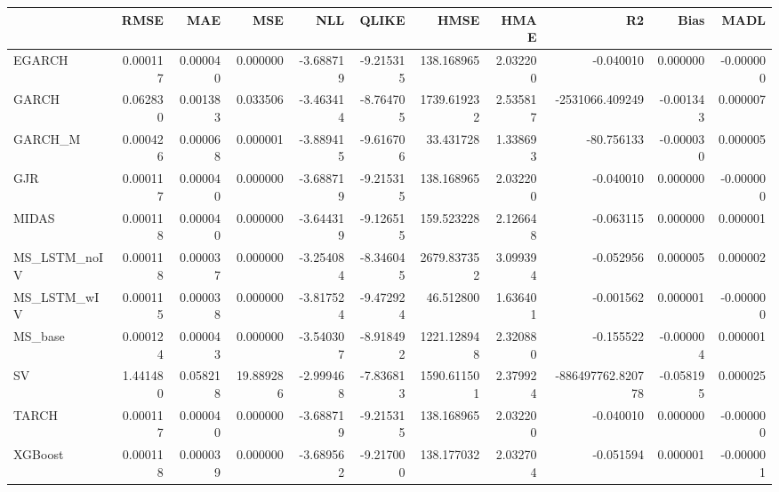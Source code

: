 \begin{tabular}{lrrrrrrrrrr}
\toprule
 & RMSE & MAE & MSE & NLL & QLIKE & HMSE & HMAE & R2 & Bias & MADL \\
\midrule
EGARCH & 0.000117 & 0.000040 & 0.000000 & -3.688719 & -9.215315 & 138.168965 & 2.032200 & -0.040010 & 0.000000 & -0.000000 \\
GARCH & 0.062830 & 0.001383 & 0.033506 & -3.463414 & -8.764705 & 1739.619232 & 2.535817 & -2531066.409249 & -0.001343 & 0.000007 \\
GARCH_M & 0.000426 & 0.000068 & 0.000001 & -3.889415 & -9.616706 & 33.431728 & 1.338693 & -80.756133 & -0.000030 & 0.000005 \\
GJR & 0.000117 & 0.000040 & 0.000000 & -3.688719 & -9.215315 & 138.168965 & 2.032200 & -0.040010 & 0.000000 & -0.000000 \\
MIDAS & 0.000118 & 0.000040 & 0.000000 & -3.644319 & -9.126515 & 159.523228 & 2.126648 & -0.063115 & 0.000000 & 0.000001 \\
MS_LSTM_noIV & 0.000118 & 0.000037 & 0.000000 & -3.254084 & -8.346045 & 2679.837352 & 3.099394 & -0.052956 & 0.000005 & 0.000002 \\
MS_LSTM_wIV & 0.000115 & 0.000038 & 0.000000 & -3.817524 & -9.472924 & 46.512800 & 1.636401 & -0.001562 & 0.000001 & -0.000000 \\
MS_base & 0.000124 & 0.000043 & 0.000000 & -3.540307 & -8.918492 & 1221.128948 & 2.320880 & -0.155522 & -0.000004 & 0.000001 \\
SV & 1.441480 & 0.058218 & 19.889286 & -2.999468 & -7.836813 & 1590.611501 & 2.379924 & -886497762.820778 & -0.058195 & 0.000025 \\
TARCH & 0.000117 & 0.000040 & 0.000000 & -3.688719 & -9.215315 & 138.168965 & 2.032200 & -0.040010 & 0.000000 & -0.000000 \\
XGBoost & 0.000118 & 0.000039 & 0.000000 & -3.689562 & -9.217000 & 138.177032 & 2.032704 & -0.051594 & 0.000001 & -0.000001 \\
\bottomrule
\end{tabular}
